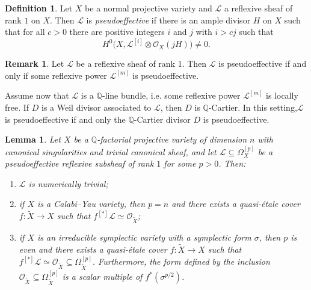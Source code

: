 \documentclass[11pt]{article}
\newtheorem{lemm}[theo]{Lemma}
\theoremstyle{definition}
\newtheorem{defi}[theo]{Definition}
\newtheorem{rema}[theo]{Remark}
\numberwithin{equation}{section}
\numberwithin{figure}{section}
\numberwithin{table}{section}
\newcommand{\Qbb}{\mathbb{Q}} %
\newcommand\sL{\mathcal{L}}
\newcommand{\OO}{\mathcal{O}}
\newcommand*{\romanenumi}{\renewcommand*{\theenumi}{\roman{enumi}}}
\begin{document}
\begin{defi}\label{def:ps}
Let $X$ be a normal projective variety and $\sL$ a reflexive sheaf of rank $1$ on $X$. Then $\sL$ is \emph{pseudoeffective} if there is an ample divisor $H$ on $X$ such that for all $c > 0$ there are positive integers $i$ and $j$ with $i > cj$ such that
\[
H^0\big(X, \sL^{[i]} \otimes \OO_X(jH)\big) \neq 0.
\]
\end{defi}

\begin{rema}\label{rema:main2.5}
Let $\sL$ be a reflexive sheaf of rank $1$. Then $\sL$ is pseudoeffective if and only if some reflexive power $\sL^{[m]}$ is pseudoeffective.

Assume now that $\sL$ is a $\Qbb$-line bundle, i.e. some reflexive power $\sL^{[m]} $ is locally free. If $D$ is a Weil divisor associated to $\sL$, then $D$ is $\Qbb$-Cartier. In this setting,\linebreak$\sL$ is pseudoeffective if and only the $\Qbb$-Cartier divisor $D$ is pseudoeffective.
\end{rema}

\begin{lemm}\label{lem1}
Let $X$ be a $\Qbb$-factorial projective variety of dimension $n$ with canonical singularities and trivial canonical sheaf, and let $\sL \subseteq \Omega^{[p]}_X$ be a pseudoeffective reflexive subsheaf of rank $1$ for some $p > 0$. Then:
\begin{enumerate}\romanenumi
\item \label{list-2.6.1}$\sL$ is numerically trivial;
\item \label{list-2.6.2}if $X$ is a Calabi--Yau variety, then $p = n$ and there exists a quasi-étale cover $f\colon \widetilde X \to X$ such that $f^{[*]}\sL \simeq \OO_{\widetilde X}$;
\item \label{list-2.6.3}if $X$ is an irreducible symplectic variety with a symplectic form $\sigma$, then $p$ is even and there exists a quasi-étale cover $f\colon \widetilde X \to X$ such that $f^{[*]}\sL \simeq \OO_{\widetilde X}\subseteq \Omega^{[p]}_{\widetilde X}$. Furthermore, the form defined by the inclusion $\OO_{\widetilde X} \subseteq \Omega^{[p]}_{\widetilde X}$ is a scalar multiple of $f^*(\sigma^{p/2})$.
\end{enumerate}
\end{lemm}
\end{document}
